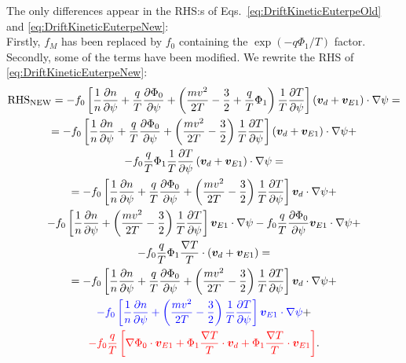\documentclass[12pt]{article}
\newcommand{\p}{\partial}
\newcommand{\na}{\nabla}
\begin{document}
\noindent The only differences appear in the RHS:s of Eqs.~\ref{eq:DriftKineticEuterpeOld} and \ref{eq:DriftKineticEuterpeNew}:\\ 
Firstly, $f_M$ has been replaced by $f_0$ containing the $\exp \left(- q \Phi_1 / T \right)$ factor.\\ 
Secondly, some of the terms have been modified. 
We rewrite the RHS of \ref{eq:DriftKineticEuterpeNew}:
\begin{multline}
{\mathrm{RHS}}_{\mathrm{NEW}} =
- f_0 \left[\frac{1}{n} \frac{\p n}{\p \psi} + \frac{q}{T} \frac{\p \Phi_0}{\p \psi} + \left(\frac{m v^2}{2 T} - \frac{3}{2} + \frac{q}{T} \Phi_1\right) \frac{1}{T} \frac{\p T}{\p \psi}\right] 
\left(\bm{v}_d + \bm{v}_{E1}\right) \cdot \na \psi = \\ =
- f_0 \left[\frac{1}{n} \frac{\p n}{\p \psi} + \frac{q}{T} \frac{\p \Phi_0}{\p \psi} + \left(\frac{m v^2}{2 T} - \frac{3}{2}\right) \frac{1}{T} \frac{\p T}{\p \psi}\right] 
\left(\bm{v}_d + \bm{v}_{E1}\right) \cdot \na \psi + \\ - 
f_0  \frac{q}{T} \Phi_1 \frac{1}{T} \frac{\p T}{\p \psi}
\left(\bm{v}_d + \bm{v}_{E1}\right) \cdot \na \psi = \\ =
- f_0 \left[\frac{1}{n} \frac{\p n}{\p \psi} + \frac{q}{T} \frac{\p \Phi_0}{\p \psi} + \left(\frac{m v^2}{2 T} - \frac{3}{2}\right) \frac{1}{T} \frac{\p T}{\p \psi}\right] 
\bm{v}_d \cdot \na \psi + \\ - 
f_0 \left[\frac{1}{n} \frac{\p n}{\p \psi} + \left(\frac{m v^2}{2 T} - \frac{3}{2}\right) \frac{1}{T} \frac{\p T}{\p \psi}\right] 
\bm{v}_{E1} \cdot \na \psi - f_0 \frac{q}{T} \frac{\p \Phi_0}{\p \psi} \bm{v}_{E1} \cdot \na \psi + \\ -
f_0 \frac{q}{T} \Phi_1 \frac{\na T}{T} \cdot
\left(\bm{v}_d + \bm{v}_{E1}\right) = \\ =
- f_0 \left[\frac{1}{n} \frac{\p n}{\p \psi} + \frac{q}{T} \frac{\p \Phi_0}{\p \psi} + \left(\frac{m v^2}{2 T} - \frac{3}{2}\right) \frac{1}{T} \frac{\p T}{\p \psi}\right] 
\bm{v}_d \cdot \na \psi + \\  
\textcolor{blue}{- f_0 \left[\frac{1}{n} \frac{\p n}{\p \psi} + \left(\frac{m v^2}{2 T} - \frac{3}{2}\right) \frac{1}{T} \frac{\p T}{\p \psi}\right] 
\bm{v}_{E1} \cdot \na \psi}  + \\  
\textcolor{red}{- f_0 \frac{q}{T} \left[\na \Phi_0 \cdot \bm{v}_{E1} + \Phi_1 \frac{\na T}{T} \cdot \bm{v}_d + \Phi_1 \frac{\na T}{T} \cdot \bm{v}_{E1} \right]}.
\label{eq:DriftKineticEuterpeNewRHS}
\end{multline}
\end{document}

